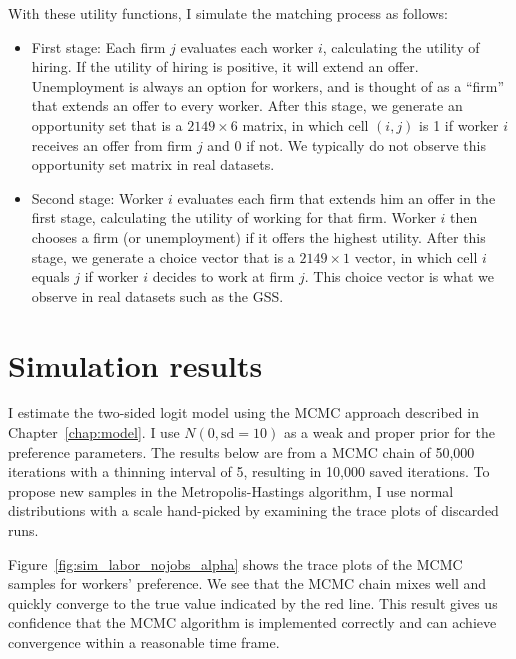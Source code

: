 With these utility functions, I simulate the matching process as follows:

\begin{itemize}
\item{First stage:} Each firm $j$ evaluates each worker $i$, calculating the utility of
  hiring. If the utility of hiring is positive, it will extend an offer.
  Unemployment is always an option for workers, and is thought of as a ``firm''
  that extends an offer to every worker. After
  this stage, we generate an opportunity set that is a $2149 \times 6$ matrix,
  in which cell $(i, j)$ is 1 if worker $i$ receives an offer from firm $j$ and
  0 if not. We typically do not observe this opportunity set matrix in real datasets.
\item{Second stage:} Worker $i$ evaluates each firm that extends him an offer in
  the first stage, calculating the utility of working for that firm. Worker $i$
  then chooses a firm (or unemployment) if it offers the highest utility. After this
  stage, we generate a choice vector that is a $2149 \times 1$ vector, in which
  cell $i$ equals $j$ if worker $i$ decides to work at firm $j$. This choice
  vector is what we observe in real datasets such as the GSS.
\end{itemize}

\section{Simulation results}

I estimate the two-sided logit model using the MCMC approach described in
Chapter~\ref{chap:model}. I use $N(0, \text{sd}=10)$ as a weak and proper prior for the preference
parameters. The results below are from a MCMC chain of 50,000
iterations with a thinning interval of 5, resulting in 10,000 saved iterations.
To propose new samples in the Metropolis-Hastings algorithm, I use normal
distributions with a scale hand-picked by examining the trace plots of discarded runs.

Figure~\ref{fig:sim_labor_nojobs_alpha} shows the trace plots of the MCMC
samples for workers' preference. We see that the MCMC chain mixes well and
quickly converge to the true value indicated by the red line. This result gives
us confidence that the MCMC algorithm is implemented correctly and can achieve
convergence within a reasonable time frame.

